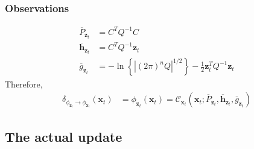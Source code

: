 \subsubsection{Observations}
\label{subsubsection:observations}
\begin{align}
\overline{P}_{\pmb{z}_{t}} &= C^{T} Q^{-1} C \\
\overline{\pmb{h}}_{\pmb{z}_{t}} &= C^{T} Q^{-1}  \pmb{z}_{t} \\
\overline{g}_{\pmb{z}_{t}} &= - \ln{ \left\{ |(2 \pi)^{n} Q |^{1/2} \right\} } - \frac{1}{2} \pmb{z}_{t}^{T} Q^{-1} \pmb{z}_{t}
\end{align}
Therefore,
\begin{align}
\delta_{\phi_{\pmb{z}_{t}} \rightarrow \phi_{\pmb{x}_{t}}} (\pmb{x}_{t}) &= \phi_{ \pmb{z}_{t} } ( \pmb{x}_{t} ) = \mathcal{C}_{\pmb{x}_{t}} \left( \pmb{x}_{t}; \overline{P}_{\pmb{z}_{t}}, \overline{\pmb{h}}_{\pmb{z}_{t}} , \overline{g}_{\pmb{z}_{t}}  \right) 
\end{align}

\subsection{The actual update}
\label{subsection:actual_update}

